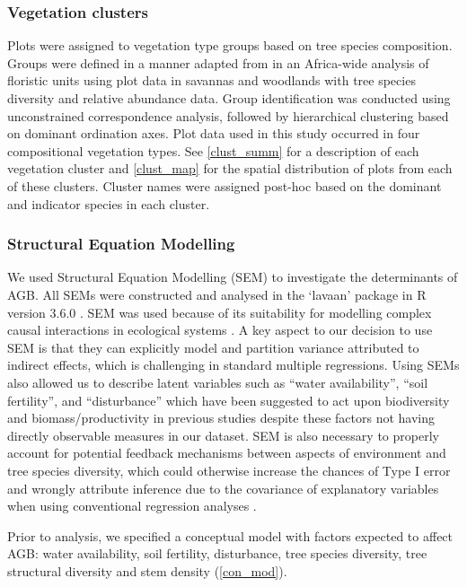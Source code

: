 \documentclass[11pt,a4paper]{article}
\begin{document}
\subsubsection{Vegetation clusters}

Plots were assigned to vegetation type groups based on tree species composition. Groups were defined in a manner adapted from \citet{Fayolle2018} in an Africa-wide analysis of floristic units using plot data in savannas and woodlands with tree species diversity and relative abundance data. Group identification was conducted using unconstrained correspondence analysis, followed by hierarchical clustering based on dominant ordination axes. Plot data used in this study occurred in four compositional vegetation types. See \autoref{clust_summ} for a description of each vegetation cluster and \autoref{clust_map} for the spatial distribution of plots from each of these clusters. Cluster names were assigned post-hoc based on the dominant and indicator species in each cluster.


\subsubsection{Structural Equation Modelling}

We used Structural Equation Modelling (SEM) to investigate the determinants of AGB. All SEMs were constructed and analysed in the `lavaan' package \citep{lavaan} in R version 3.6.0 \citep{R2019}. SEM was used because of its suitability for modelling complex causal interactions in ecological systems \citep{Lee2007}. A key aspect to our decision to use SEM is that they can explicitly model and partition variance attributed to indirect effects, which is challenging in standard multiple regressions. Using SEMs also allowed us to describe latent variables such as ``water availability'', ``soil fertility'', and ``disturbance'' which have been suggested to act upon biodiversity and biomass/productivity in previous studies despite these factors not having directly observable measures in our dataset. SEM is also necessary to properly account for potential feedback mechanisms between aspects of environment and tree species diversity, which could otherwise increase the chances of Type I error and wrongly attribute inference due to the covariance of explanatory variables when using conventional regression analyses \citep{Nachtigall2003}.

Prior to analysis, we specified a conceptual model with factors expected to affect AGB: water availability, soil fertility, disturbance, tree species diversity, tree structural diversity and stem density (\autoref{con_mod}). 
\end{document}
